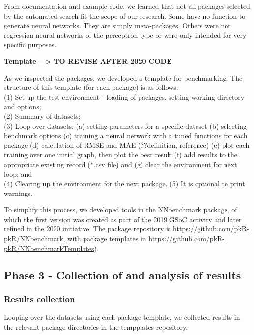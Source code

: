 From documentation and example code, we learned that not all packages
selected by the automated search fit the scope of our research. Some
have no function to generate neural networks. They are simply
meta-packages. Others were not regression neural networks of the
perceptron type or were only intended for very specific purposes.

\textbf{Template =\textgreater{} TO REVISE AFTER 2020 CODE}

As we inspected the packages, we developed a template for benchmarking.
The structure of this template (for each package) is as follows:\\
(1) Set up the test environment - loading of packages, setting working
directory and options;\\
(2) Summary of datasets;\\
(3) Loop over datasets: (a) setting parameters for a specific dataset
(b) selecting benchmark options (c) training a neural network with a
tuned functions for each package (d) calculation of RMSE and MAE
(??definition, reference) (e) plot each training over one initial graph,
then plot the best result (f) add results to the appropriate existing
record (*.csv file) and (g) clear the environment for next loop; and\\
(4) Clearing up the environment for the next package. (5) It is optional
to print warnings.

To simplify this process, we developed tools in the NNbenchmark package,
of which the first version was created as part of the 2019 GSoC activity
and later refined in the 2020 initiative. The package repository is
\url{https://github.com/pkR-pkR/NNbenchmark}, with package templates in
\url{https://github.com/pkR-pkR/NNbenchmarkTemplates}).

\hypertarget{phase-3---collection-of-and-analysis-of-results}{%
\subsection{Phase 3 - Collection of and analysis of
results}\label{phase-3---collection-of-and-analysis-of-results}}

\hypertarget{results-collection}{%
\subsubsection{Results collection}\label{results-collection}}

Looping over the datasets using each package template, we collected
results in the relevant package directories in the tempplates
repository.

